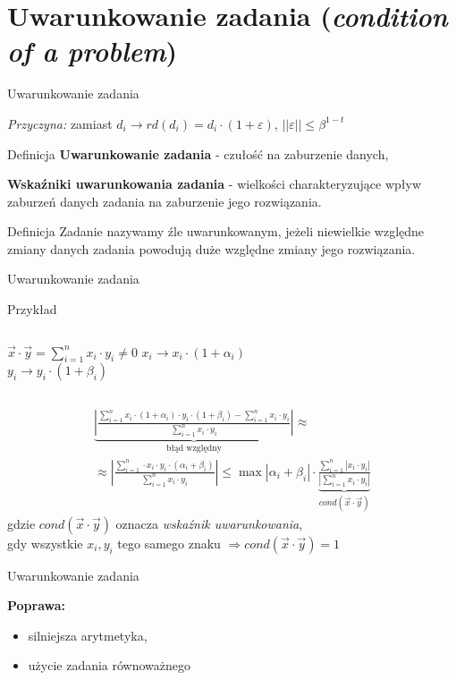 \section{Uwarunkowanie zadania ({\it condition of a problem})}
\begin{frame}{Uwarunkowanie zadania}

	{\it Przyczyna:} zamiast 
    	$d_i \rightarrow rd(d_i) = d_i \cdot (1 + \varepsilon)$,
        $||\varepsilon|| \le \beta^{1-t}$
        
    \begin{block}{Definicja}
    	{\bf Uwarunkowanie zadania} - czułość na zaburzenie danych,
        
        {\bf Wskaźniki uwarunkowania zadania} - wielkości charakteryzujące wpływ zaburzeń danych zadania na zaburzenie jego rozwiązania.
    \end{block}
    
    \begin{block}{Definicja}
    Zadanie nazywamy źle uwarunkowanym, jeżeli niewielkie względne zmiany danych zadania powodują duże względne zmiany jego rozwiązania.
    \end{block}
\end{frame}
\begin{frame}{Uwarunkowanie zadania}
	\begin{exampleblock}{Przykład}
    \begin{columns}
        	\centering
            $\vec{x} \cdot \vec{y} = \sum_{i=1}^n x_i \cdot y_i \neq 0$
                $x_i \rightarrow x_i \cdot (1 + \alpha_i)$ \\
                $y_i \rightarrow y_i \cdot (1 + \beta_i)$
    \end{columns}
    \begin{gather*}
    	\underbrace{\left| \frac{
        	\sum_{i=1}^n x_i \cdot (1 + \alpha_i) \cdot y_i \cdot (1 + \beta_i) - \sum_{i=1}^n x_i \cdot y_i
        }{
        	\sum_{i=1}^n x_i \cdot y_i
        }\right|}_\text{błąd względny}
        \approx \\ \approx
        \left| \frac{
        	\sum_{i=1}^n \cdot x_i \cdot y_i \cdot \left( \alpha_i + \beta_i \right)
        }{
        	\sum_{i=1}^n x_i \cdot y_i
        }\right|
        \le
        \max \left| \alpha_i + \beta_i \right| \cdot \underbrace{\frac{
        	\sum_{i=1}^n \left| x_i \cdot y_i \right|
        }{
        	\left| \sum_{i=1}^n x_i \cdot y_i \right|
        }}_{cond(\vec{x} \cdot \vec{y})}
    \end{gather*}
    gdzie $cond(\vec{x} \cdot \vec{y})$ oznacza {\it wskaźnik uwarunkowania}, \\ 
    gdy wszystkie $x_i, y_i$ tego samego znaku $\Rightarrow cond(\vec{x} \cdot \vec{y}) = 1$
    \end{exampleblock}
\end{frame}
\begin{frame}{Uwarunkowanie zadania}

	{\bf Poprawa:}
    \begin{itemize}
    	\item silniejsza arytmetyka,
        \item użycie zadania równoważnego
    \end{itemize}
\end{frame}
